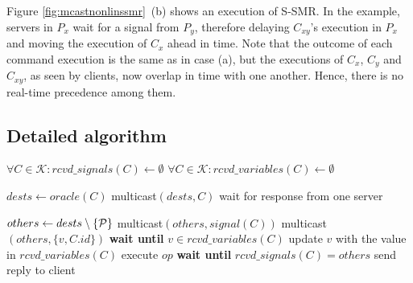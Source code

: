 Figure \ref{fig:mcastnonlinssmr}~(b) shows an execution of S-SMR. 
In the example, servers in $P_x$ wait for a signal from $P_y$, therefore delaying $C_{xy}$'s execution in $P_x$ and moving the execution of $C_x$ ahead in time. 
Note that the outcome of each command execution is the same as in case (a), but the executions of $C_x$, $C_y$ and $C_{xy}$, as seen by clients, now overlap in time with one another. 
Hence, there is no real-time precedence among them.

\subsection{Detailed algorithm}
\label{sec:detailalg}


\begin{algorithm}
\small
\begin{distribalgo}[1]
\vspace{1mm}

    \STATE $\forall C \in \mathcal{K} : rcvd\_signals(C) \leftarrow \emptyset$
    \STATE $\forall C \in \mathcal{K} : rcvd\_variables(C) \leftarrow \emptyset$
\ENDINDENT

\vspace{1.5mm}
    \STATE $dests \leftarrow oracle(C)$ \label{algline:oracle} 
	\STATE multicast$(dests, C)$ \label{algline:climcast}
	\STATE wait for response from one server
\ENDINDENT

\vspace{1.5mm}
	    \STATE $others \leftarrow dests \setminus \{\mathcal{P}\}$ \label{algline:others}
	    \STATE multicast$(others, signal(C))$ \label{algline:mcastsignals}
			        \STATE multicast$(others, \{v,C.id\})$ \label{algline:multicastv}
			    \ELSE
			        \STATE \textbf{wait until} $v \in rcvd\_variables(C)$ \label{algline:waitvariable}
			        \STATE update $v$ with the value in $rcvd\_variables(C)$
			    \ENDIF
			\ENDIF
			\STATE execute $op$ \label{algline:executeopck}
		\ENDFOR
		\STATE \textbf{wait until} $rcvd\_signals(C) = others$ \label{algline:waitsignals}
		\STATE send reply to client \label{algline:sendreply}
	\ENDINDENT
	

\end{distribalgo}
\end{algorithm}
